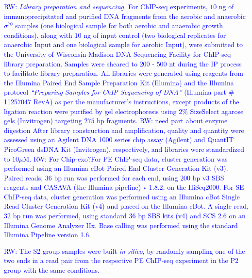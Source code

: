 \documentclass{bmcart}
\newcommand{\SK}[1]{\textcolor{red}{SK: #1}}
\newcommand{\RW}[1]{\textcolor{blue}{RW: #1}}
\newcommand{\sig}{\sigma^{70}}
\begin{document}
\RW{ \textit{Library preparation and sequencing.} For ChIP-seq
  experiments, $10$ ng of immunoprecipitated and purified DNA
  fragments from the aerobic and anaerobic $\sig$ samples (one
  biological sample for both aerobic and anaerobic growth conditions),
  along with $10$ ng of input control (two biological replicates for
  anaerobic Input and one biological sample for aerobic Input), were
  submitted to the University of Wisconsin-Madison DNA Sequencing
  Facility for ChIP-seq library preparation. Samples were sheared to
  $200$ - $500$ nt during the IP process to facilitate library
  preparation. All libraries were generated using reagents from the
  Illumina Paired End Sample Preparation Kit (Illumina) and the
  Illumina protocol \textit{``Preparing Samples for ChIP Sequencing of
    DNA''} (Illumina part \# 11257047 RevA) as per the manufacturer's
  instructions, except products of the ligation reaction were purified
  by gel electrophoresis using $2\%$ SizeSelect agarose gels
  (Invitrogen) targeting $275$ bp fragments. \RW{need part about
    enzyme digestion} After library construction and amplification,
  quality and quantity were assessed using an Agilent DNA 1000 series
  chip assay (Agilent) and QuantIT PicoGreen dsDNA Kit (Invitrogen),
  respectively, and libraries were standardized to $10 \mu$M. \RW{For
    Chip-exo?}For PE ChIP-seq data, cluster generation was performed
  using an Illumina cBot Paired End Cluster Generation Kit
  (v3). Paired reads, $36$ bp run was performed for each end, using
  $200$ bp v3 SBS reagents and CASAVA (the Illumina pipeline) v 1.8.2,
  on the HiSeq2000. For SE ChIP-seq data, cluster generation was
  performed using an Illumina cBot Single Read Cluster Generation Kit
  (v4) and placed on the Illumina cBot. A single read, $32$ bp run was
  performed, using standard $36$ bp SBS kits (v4) and SCS 2.6 on an
  Illumina Genome Analyzer IIx. Base calling was performed using the
  standard Illumina Pipeline version 1.6.}

\RW{The S2 group samples were built \textit{in silico}, by randomly
  sampling one of the two ends in a read pair from the respective PE
  ChIP-seq experiment in the P2 group with the same conditions.}


\end{document}
